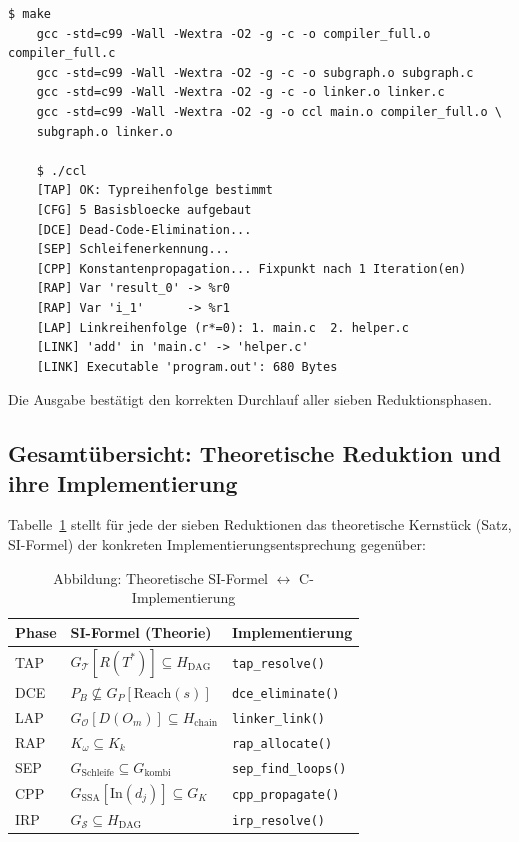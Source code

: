 ﻿\documentclass[a4paper,12pt]{article}
\theoremstyle{definition}
\begin{document}
\begin{lstlisting}[style=bashstyle, caption={Build und Ausführung},
	label=lst:build]
	$ make
	gcc -std=c99 -Wall -Wextra -O2 -g -c -o compiler_full.o compiler_full.c
	gcc -std=c99 -Wall -Wextra -O2 -g -c -o subgraph.o subgraph.c
	gcc -std=c99 -Wall -Wextra -O2 -g -c -o linker.o linker.c
	gcc -std=c99 -Wall -Wextra -O2 -g -o ccl main.o compiler_full.o \
	subgraph.o linker.o
	
	$ ./ccl
	[TAP] OK: Typreihenfolge bestimmt
	[CFG] 5 Basisbloecke aufgebaut
	[DCE] Dead-Code-Elimination...
	[SEP] Schleifenerkennung...
	[CPP] Konstantenpropagation... Fixpunkt nach 1 Iteration(en)
	[RAP] Var 'result_0' -> %r0
	[RAP] Var 'i_1'      -> %r1
	[LAP] Linkreihenfolge (r*=0): 1. main.c  2. helper.c
	[LINK] 'add' in 'main.c' -> 'helper.c'
	[LINK] Executable 'program.out': 680 Bytes
\end{lstlisting}

Die Ausgabe bestätigt den korrekten Durchlauf aller sieben Reduktionsphasen.

\subsection{Gesamtübersicht: Theoretische Reduktion und ihre Implementierung}

Tabelle~\ref{tab:impl-uebersicht} stellt für jede der sieben Reduktionen
das theoretische Kernstück (Satz, SI-Formel) der konkreten
Implementierungsentsprechung gegenüber:

\begin{table}[h!]
	\centering
	\renewcommand{\arraystretch}{1.5}
	\begin{tabular}{|l|l|l|}
		\hline
		\textbf{Phase} & \textbf{SI-Formel (Theorie)} & \textbf{Implementierung} \\
		\hline
		TAP &
		$G_{\mathcal{T}}[R(T^*)] \subseteq H_{\text{DAG}}$ &
		\texttt{tap\_resolve()} \\
		DCE &
		$P_B \not\subseteq G_P[\mathrm{Reach}(s)]$ &
		\texttt{dce\_eliminate()} \\
		LAP &
		$G_{\mathcal{O}}[D(O_m)] \subseteq H_{\text{chain}}$ &
		\texttt{linker\_link()} \\
		RAP &
		$K_\omega \subseteq K_k$ &
		\texttt{rap\_allocate()} \\
		SEP &
		$G_{\text{Schleife}} \subseteq G_{\text{kombi}}$ &
		\texttt{sep\_find\_loops()} \\
		CPP &
		$G_{\text{SSA}}[\mathrm{In}(d_j)] \subseteq G_K$ &
		\texttt{cpp\_propagate()} \\
		IRP &
		$G_{\mathcal{S}} \subseteq H_{\text{DAG}}$ &
		\texttt{irp\_resolve()} \\
		\hline
	\end{tabular}
	\caption{Abbildung: Theoretische SI-Formel $\leftrightarrow$ C-Implementierung}
	\label{tab:impl-uebersicht}
\end{table}
\end{document}
